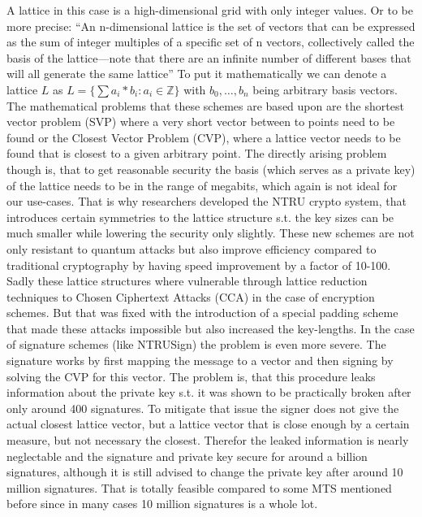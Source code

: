 \documentclass[conference]{IEEEtran}
\begin{document}
A lattice in this case is a high-dimensional grid with only integer values. Or to be more precise: ``An n-dimensional lattice is the set of vectors that can be expressed as the sum of integer multiples of a specific set of n vectors, collectively called the basis of the lattice—note that there are an infinite number of different bases that will all generate the same lattice'' \cite{QR_algs}
To put it mathematically we can denote a lattice $L$ as $L=\{\sum a_i*b_i : a_i \in \mathbb{Z}\}$ with $b_0,\dots,b_n$ being arbitrary basis vectors.
The mathematical problems that these schemes are based upon are the shortest vector problem (SVP) where a very short vector between to points need to be found or the Closest Vector Problem (CVP), where a lattice vector needs to be found that is closest to a given arbitrary point.
The directly arising problem though is, that to get reasonable security the basis (which serves as a private key) of the lattice needs to be in the range of megabits, which again is not ideal for our use-cases. That is why researchers developed the NTRU crypto system, that introduces certain symmetries to the lattice structure s.t. the key sizes can be much smaller while lowering the security only slightly.\cite{QR_algs,QR_comparison}
These new schemes are not only resistant to quantum attacks but also improve efficiency compared to traditional cryptography by having speed improvement by a factor of 10-100.\cite{QR_sigs}
Sadly these lattice structures where vulnerable through lattice reduction techniques to Chosen Ciphertext Attacks (CCA) in the case of encryption schemes. But that was fixed with the introduction of a special padding scheme that made these attacks impossible but also increased the key-lengths. \cite{QR_algs}
In the case of signature schemes (like NTRUSign) the problem is even more severe.
The signature works by first mapping the message to a vector and then signing by solving the CVP for this vector. The problem is, that this procedure leaks information about the private key s.t. it was shown to be practically broken after only around 400 signatures.  To mitigate that issue the signer does not give the actual closest lattice vector, but a lattice vector that is close enough by a certain measure, but not necessary the closest. Therefor the leaked information is nearly neglectable and the signature and private key secure for around a billion signatures, although it is still advised to change the private key after around 10 million signatures. 
That is totally feasible compared to some MTS mentioned before since in many cases 10 million signatures is a whole lot.\cite{QR_IoT}
\end{document}
